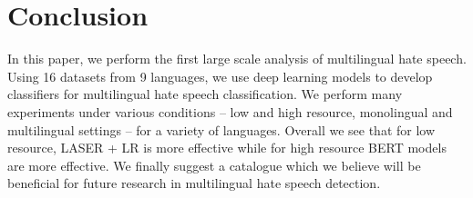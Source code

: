 \documentclass[runningheads]{llncs}
\begin{document}
\section{Conclusion}
In this paper, we perform the first large scale analysis of multilingual hate speech. Using 16 datasets from 9 languages, we use deep learning models to develop classifiers for multilingual hate speech classification. We perform many experiments under various conditions -- low and high resource, monolingual and multilingual settings -- for a variety of languages. Overall we see that for low resource, LASER + LR is more effective while for high resource BERT models are more effective. We finally suggest a catalogue which we believe will be beneficial for future research in multilingual hate speech detection.



\end{document}
